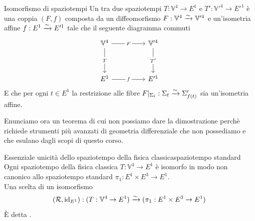\documentclass[openany]{book}
\renewcommand\V{\mathbb{V}}
\begin{document}
\begin{definition}{Isomorfismo di spaziotempi}{}
    Un  tra due spaziotempi $T:\V^4\to E^1$ e $T':\V'^4 \to E'^1$ è una coppia $(F,f)$ composta da un diffeomorfismo $F:\V^4\iso\V'^4$ e un'isometria affine $f: E^1\xrightarrow{\sim} E'^1$ tale che il seguente diagramma commuti 
    \[\begin{tikzcd}
    	{\V^4} && {\V'^4} \\
	    \\
	    {E^1} && {E'^1}
	    \arrow["F"{description}, from=1-1, to=1-3]
	    \arrow["T"{description}, from=1-1, to=3-1]
	    \arrow["{T'}"{description}, from=1-3, to=3-3]
	    \arrow["f"{description}, from=3-1, to=3-3]
    \end{tikzcd}\]
    E che per ogni $t \in E^1$ la restrizione alle fibre $F|_{\Sigma_t} :\Sigma_t\xrightarrow{\sim} \Sigma'_{f(t)}$ sia un'isometria affine.
\end{definition}

Enunciamo ora un teorema di cui non possiamo dare la dimostrazione perchè richiede strumenti più avanzati di geometria differenziale che non possediamo e che esulano dagli scopi di questo corso.

\begin{theorem}{Essenziale unicità dello spaziotempo della fisica classica}{spaziotempo standard}
    Ogni spaziotempo della fisica classica $T:\V^4\to E^1$ è isomorfo in modo non canonico allo spaziotempo standard $\pi_1: E^1 \times E^3\to E^1$.\\
    Una scelta di un isomorfismo 
    \[ (\mc R, \id_{E^1}) : (T:\V^4\to E^1) \iso (\pi_1: E^1 \times E^3\to E^1)  \]
    È detta .
\end{theorem}
\end{document}
